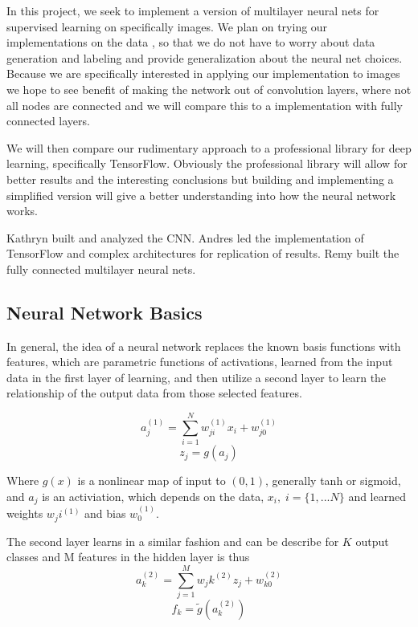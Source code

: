 \documentclass[12pt, twocolumn]{article}
\begin{document}
In this project, we seek to implement a version of multilayer neural nets for supervised learning on specifically images. We plan on trying our implementations on the data , so that we do not have to worry about data generation and labeling and provide generalization about the neural net choices. Because we are specifically interested in applying our implementation to images we hope to see benefit of making the network out of convolution layers, where not all nodes are connected and we will compare this to a implementation with fully connected layers.

 We will then compare our rudimentary approach to a professional library for deep learning, specifically TensorFlow. Obviously the professional library will allow for better results and the interesting conclusions but building and implementing a simplified version will give a better understanding into how the neural network works. 
 
 Kathryn built and analyzed the CNN. Andres led the implementation of TensorFlow and complex architectures for replication of results. Remy built the fully connected multilayer neural nets. 

\subsection{Neural Network Basics}

In general, the idea of a neural network replaces the known basis functions with features, which are parametric functions of activations, learned from the input data in the first layer of learning, and then utilize a second layer to learn the relationship of the output data from those selected features.

\begin{equation}
a_j^{(1)}= \sum_{i=1}^N w_{ji}^{(1)} x_i+w_{j0}^{(1)}
\end{equation}
\begin{equation}
z_j= g(a_j)
\end{equation}

Where $g(x)$ is a nonlinear map of input to $(0,1)$, generally tanh or sigmoid, and $a_j$ is an activiation, which depends on the data, $x_i, \; i=\{1,...N\}$  and learned weights $w_ji^{(1)}$ and bias $w_0^{(1)}$. 

The second layer learns in a similar fashion and can be describe for $K$ output classes and M features in the  hidden layer  is thus 
\begin{equation}
a_k^{(2)}= \sum_{j=1}^M w_jk^{(2)} z_j+w_{k0}^{(2)}
\end{equation}
\begin{equation}
f_k= \tilde{g}(a_k^{(2)})
\end{equation}
 
\end{document}

